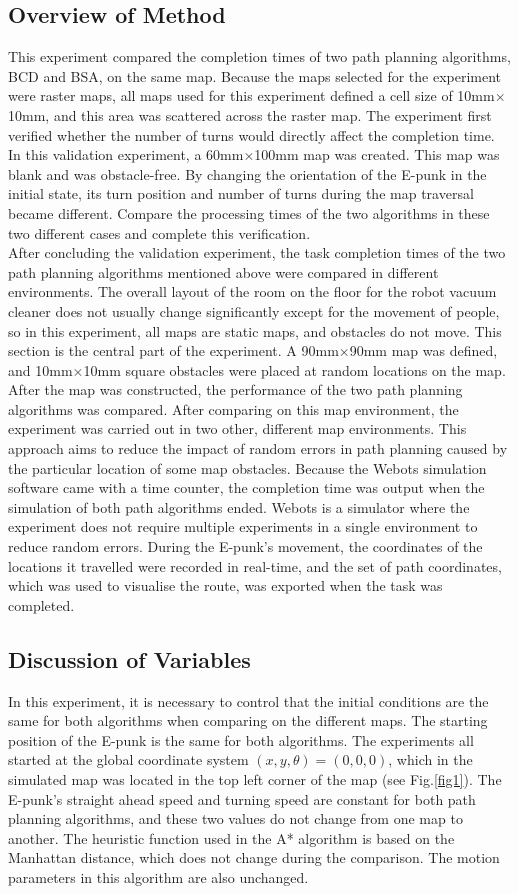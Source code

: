 \documentclass[conference]{IEEEtran}
\begin{document}
\subsection{Overview of Method}
This experiment compared the completion times of two path planning algorithms, BCD and BSA, on the same map. Because the maps selected for the experiment were raster maps, all maps used for this experiment defined a cell size of 10mm$\times$10mm, and this area was scattered across the raster map. The experiment first verified whether the number of turns would directly affect the completion time. In this validation experiment, a 60mm$\times$100mm map was created. This map was blank and was obstacle-free. By changing the orientation of the E-punk in the initial state, its turn position and number of turns during the map traversal became different. Compare the processing times of the two algorithms in these two different cases and complete this verification.\\
After concluding the validation experiment, the task completion times of the two path planning algorithms mentioned above were compared in different environments. The overall layout of the room on the floor for the robot vacuum cleaner does not usually change significantly except for the movement of people, so in this experiment, all maps are static maps, and obstacles do not move. This section is the central part of the experiment. A 90mm$\times$90mm map was defined, and 10mm$\times$10mm square obstacles were placed at random locations on the map. After the map was constructed, the performance of the two path planning algorithms was compared. After comparing on this map environment, the experiment was carried out in two other, different map environments. This approach aims to reduce the impact of random errors in path planning caused by the particular location of some map obstacles. Because the Webots simulation software came with a time counter, the completion time was output when the simulation of both path algorithms ended. Webots is a simulator where the experiment does not require multiple experiments in a single environment to reduce random errors. During the E-punk's movement, the coordinates of the locations it travelled were recorded in real-time, and the set of path coordinates, which was used to visualise the route, was exported when the task was completed.
\subsection{Discussion of Variables}
In this experiment, it is necessary to control that the initial conditions are the same for both algorithms when comparing on the different maps. The starting position of the E-punk is the same for both algorithms. The experiments all started at the global coordinate system $(x, y, \theta) = (0, 0, 0)$, which in the simulated map was located in the top left corner of the map (see Fig.\ref{fig1}). The E-punk's straight ahead speed and turning speed are constant for both path planning algorithms, and these two values do not change from one map to another. The heuristic function used in the A* algorithm is based on the Manhattan distance, which does not change during the comparison. The motion parameters in this algorithm are also unchanged.
\end{document}
